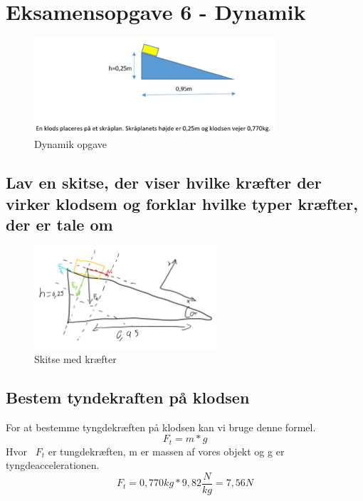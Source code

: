 \newpage
\section{Eksamensopgave 6 - Dynamik}
\begin{figure}[h!]
    \centering
    \includegraphics[width=0.8\textwidth]{figures/dynamik.png}
    \caption{Dynamik opgave}
\end{figure}
\subsection{Lav en skitse, der viser hvilke kræfter der virker klodsem og forklar hvilke typer kræfter, der er tale om}
\begin{figure}[h!]
    \centering
    \includegraphics[width=0.6\textwidth]{figures/dynamikskitse.png}
    \caption{Skitse med kræfter}
\end{figure}
\subsection{Bestem tyndekraften på klodsen}
For at bestemme tyngdekræften på klodsen kan vi bruge denne formel.
\begin{equation*}
    F_{t} = m * g
\end{equation*}
Hvor ~$F_{t}$ er tungdekræften, m er massen af vores objekt og g er tyngdeaccelerationen.
\begin{equation*}
    F_{t} = 0,770kg * 9,82\frac{N}{kg} = 7,56N
\end{equation*}
